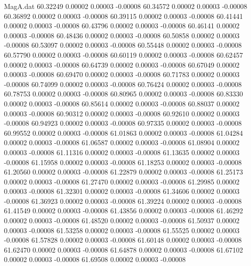 \begin{filecontents}{MagA.dat}
  60.32249    0.00002    0.00003   -0.00008
  60.34572    0.00002    0.00003   -0.00008
  60.36892    0.00002    0.00003   -0.00008
  60.39115    0.00002    0.00003   -0.00008
  60.41441    0.00002    0.00003   -0.00008
  60.43796    0.00002    0.00003   -0.00008
  60.46141    0.00002    0.00003   -0.00008
  60.48436    0.00002    0.00003   -0.00008
  60.50858    0.00002    0.00003   -0.00008
  60.53097    0.00002    0.00003   -0.00008
  60.55448    0.00002    0.00003   -0.00008
  60.57790    0.00002    0.00003   -0.00008
  60.60119    0.00002    0.00003   -0.00008
  60.62457    0.00002    0.00003   -0.00008
  60.64739    0.00002    0.00003   -0.00008
  60.67049    0.00002    0.00003   -0.00008
  60.69470    0.00002    0.00003   -0.00008
  60.71783    0.00002    0.00003   -0.00008
  60.74099    0.00002    0.00003   -0.00008
  60.76424    0.00002    0.00003   -0.00008
  60.78753    0.00002    0.00003   -0.00008
  60.80965    0.00002    0.00003   -0.00008
  60.83330    0.00002    0.00003   -0.00008
  60.85614    0.00002    0.00003   -0.00008
  60.88037    0.00002    0.00003   -0.00008
  60.90312    0.00002    0.00003   -0.00008
  60.92610    0.00002    0.00003   -0.00008
  60.94923    0.00002    0.00003   -0.00008
  60.97335    0.00002    0.00003   -0.00008
  60.99552    0.00002    0.00003   -0.00008
  61.01863    0.00002    0.00003   -0.00008
  61.04284    0.00002    0.00003   -0.00008
  61.06587    0.00002    0.00003   -0.00008
  61.08904    0.00002    0.00003   -0.00008
  61.11316    0.00002    0.00003   -0.00008
  61.13635    0.00002    0.00003   -0.00008
  61.15958    0.00002    0.00003   -0.00008
  61.18253    0.00002    0.00003   -0.00008
  61.20560    0.00002    0.00003   -0.00008
  61.22879    0.00002    0.00003   -0.00008
  61.25173    0.00002    0.00003   -0.00008
  61.27470    0.00002    0.00003   -0.00008
  61.29985    0.00002    0.00003   -0.00008
  61.32301    0.00002    0.00003   -0.00008
  61.34606    0.00002    0.00003   -0.00008
  61.36923    0.00002    0.00003   -0.00008
  61.39224    0.00002    0.00003   -0.00008
  61.41549    0.00002    0.00003   -0.00008
  61.43856    0.00002    0.00003   -0.00008
  61.46292    0.00002    0.00003   -0.00008
  61.48520    0.00002    0.00003   -0.00008
  61.50937    0.00002    0.00003   -0.00008
  61.53258    0.00002    0.00003   -0.00008
  61.55525    0.00002    0.00003   -0.00008
  61.57828    0.00002    0.00003   -0.00008
  61.60148    0.00002    0.00003   -0.00008
  61.62470    0.00002    0.00003   -0.00008
  61.64878    0.00002    0.00003   -0.00008
  61.67102    0.00002    0.00003   -0.00008
  61.69508    0.00002    0.00003   -0.00008

\end{filecontents}
